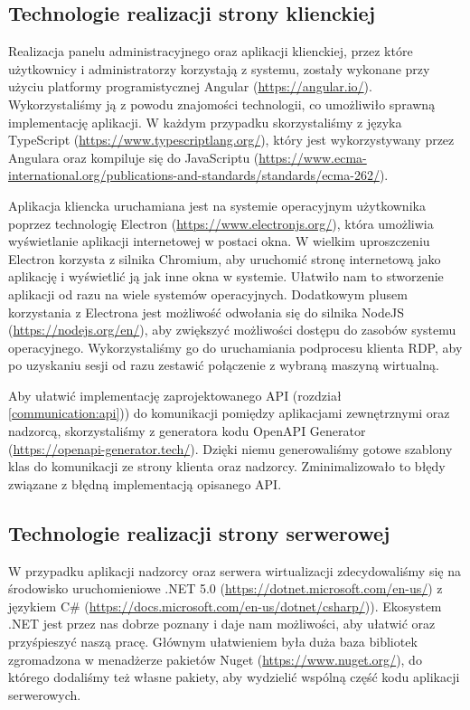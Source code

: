 \documentclass[../opis-rozwiazania.tex]{subfiles}
\begin{document}
\label{technologies}

\subsection{Technologie realizacji strony klienckiej}
Realizacja panelu administracyjnego oraz aplikacji klienckiej, przez które użytkownicy i administratorzy korzystają z systemu, zostały wykonane przy użyciu platformy programistycznej Angular (\url{https://angular.io/}).
Wykorzystaliśmy ją z powodu znajomości technologii, co umożliwiło sprawną implementację aplikacji.
W każdym przypadku skorzystaliśmy z języka TypeScript (\url{https://www.typescriptlang.org/}), który jest wykorzystywany przez Angulara oraz kompiluje się do JavaScriptu (\url{https://www.ecma-international.org/publications-and-standards/standards/ecma-262/}).

Aplikacja kliencka uruchamiana jest na systemie operacyjnym użytkownika poprzez technologię Electron (\url{https://www.electronjs.org/}), która umożliwia wyświetlanie aplikacji internetowej w postaci okna.
W wielkim uproszczeniu Electron korzysta z silnika Chromium, aby uruchomić stronę internetową jako aplikację i wyświetlić ją jak inne okna w systemie.
Ułatwiło nam to stworzenie aplikacji od razu na wiele systemów operacyjnych.
Dodatkowym plusem korzystania z Electrona jest możliwość odwołania się do silnika NodeJS (\url{https://nodejs.org/en/}), aby zwiększyć możliwości dostępu do zasobów systemu operacyjnego.
Wykorzystaliśmy go do uruchamiania podprocesu klienta RDP, aby po uzyskaniu sesji od razu zestawić połączenie z wybraną maszyną wirtualną.

Aby ułatwić implementację zaprojektowanego API (rozdział \ref{communication:api})) do komunikacji pomiędzy aplikacjami zewnętrznymi oraz nadzorcą, skorzystaliśmy z generatora kodu OpenAPI Generator (\url{https://openapi-generator.tech/}).
Dzięki niemu generowaliśmy gotowe szablony klas do komunikacji ze strony klienta oraz nadzorcy.
Zminimalizowało to błędy związane z błędną implementacją opisanego API.

\subsection{Technologie realizacji strony serwerowej}
W przypadku aplikacji nadzorcy oraz serwera wirtualizacji zdecydowaliśmy się na środowisko uruchomieniowe .NET 5.0 (\url{https://dotnet.microsoft.com/en-us/}) z językiem C\# (\url{https://docs.microsoft.com/en-us/dotnet/csharp/})).
Ekosystem .NET jest przez nas dobrze poznany i daje nam możliwości, aby ułatwić oraz przyśpieszyć naszą pracę.
Głównym ułatwieniem była duża baza bibliotek zgromadzona w menadżerze pakietów Nuget (\url{https://www.nuget.org/}), do którego dodaliśmy też własne pakiety, aby wydzielić wspólną część kodu aplikacji serwerowych.
\end{document}
